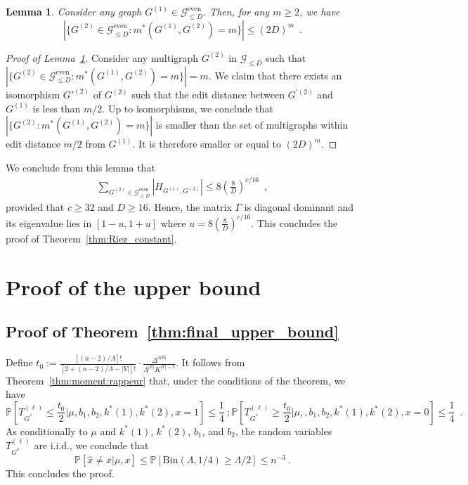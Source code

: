 \documentclass{article}
\newtheorem{lemma}{Lemma}
\begin{document}
\begin{lemma}\label{lem:combinatoire_m*}
    Consider any graph $G^{(1)} \in \mathcal G_{\leq D}^{\mathrm{even}}$. Then, for any $m\geq 2$, we have  
    $$|\{G^{(2)}\in \mathcal G_{\leq D}^{\mathrm{even}} : m^*( G^{(1)},  G^{(2)}) = m\}| \leq (2D)^{m}\enspace .$$
\end{lemma}
\begin{proof}[Proof of Lemma~\ref{lem:combinatoire_m*}]
    Consider any multigraph $G^{(2)}$ in $\mathcal{G}_{\leq D}$ such that $|\{G^{(2)}\in \mathcal G_{\leq D}^{\mathrm{even}}: m^*( G^{(1)},  G^{(2)}) = m\}|=m$. We claim that there exists an isomorphism $G'^{(2)}$ of $G^{(2)}$ such that the edit distance  between $G^{'(2)}$ and $G^{(1)}$ is less than $m/2$. Up to isomorphisms, we conclude that $|\{G^{(2)}: m^*( G^{(1)},  G^{(2)}) = m\}|$  is smaller than the set of multigraphs within edit distance $m/2$ from $G^{(1)}$. It is therefore smaller or equal to $(2D)^{m}$. 
    \end{proof}
We conclude from this lemma that 
\begin{eqnarray}\label{eq:control_covariance:PT:6}
    \sum_{G^{(2)} \in \mathcal G_{\leq D}^{\mathrm{even}}}\left|H_{G^{(1)}, G^{(2)}}\right| \leq 8 \left(\frac{8}{D}\right)^{c/16}\enspace ,
\end{eqnarray}
provided that $c\geq 32$ and $D\geq 16$. Hence, the matrix $\Gamma$ is diagonal dominant and its eigenvalue lies in $[1-u, 1+u]$ where $u = 8 \left(\frac{8}{D}\right)^{c/16}$. 
This concludes the proof of Theorem~\ref{thm:Riez_constant}.




    


\section{Proof of the upper bound}\label{sec:proof:UB}
\subsection{Proof of Theorem~\ref{thm:final_upper_bound}}

Define $t_0:= \frac{[(n-2)/\Lambda]!}{[2+ (n-2)/\Lambda-|V|]!} \cdot \frac{\Delta^{2|E|}}{\Lambda^{|E|} K^{|V|-2}}$. 
It follows from Theorem~\ref{thm:moment:rappeur} that, under the conditions of the theorem, we have
\[
\mathbb{P}\left[T^{(\ell)}_{G^*}\leq \frac{t_0}{2}|\mu,b_1,b_2,k^*(1),k^*(2), x=1\right]\leq \frac{1}{4} \ ; \mathbb{P}\left[T^{(\ell)}_{G^*}\geq \frac{t_0}{2}|\mu,,b_1,b_2,k^*(1),k^*(2), x=0\right]\leq \frac{1}{4}\enspace . 
\]
As conditionally to $\mu$ and $k^*(1)$, $k^*(2)$, $b_1$, and $b_2$, the random variables $T^{(\ell)}_{G^*}$ are i.i.d., we conclude that 
\[
\mathbb{P}[\hat{x}\neq x|\mu, x] \leq \mathbb{P}[\mathrm{Bin}(\Lambda,1/4)\geq \Lambda/2] \leq n^{-3}\ . 
\]
This concludes the proof. 
\end{document}
